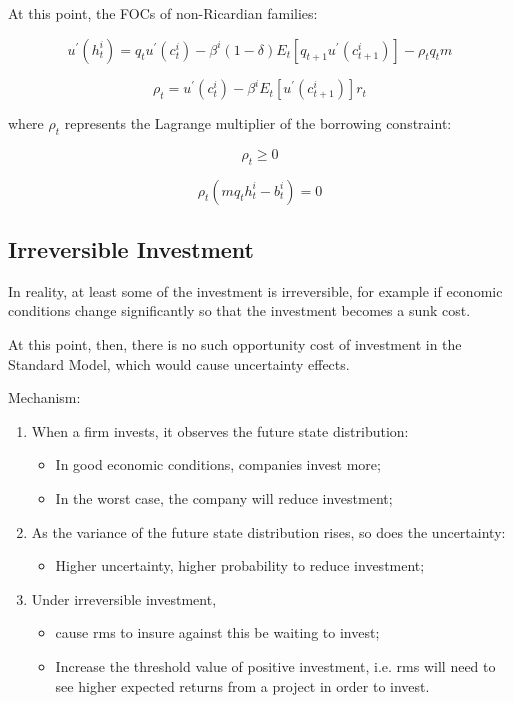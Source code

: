 \documentclass[10pt,math=newtx,citestyle=gb7714-2015,bibstyle=gb7714-2015]{elegantbook}
\begin{document}
At this point, the FOCs of non-Ricardian families:

\begin{equation}\label{label}
	u^{'}(h_t^i)=q_tu^{'}(c_t^i)-\beta^i(1-\delta)E_t[q_{t+1}u^{'}(c_{t+1}^i)]-\rho_tq_tm
\end{equation}

\begin{equation}\label{label}
	\rho_t=u^{'}(c_{t}^i)-\beta^iE_t\left[u^{'}(c_{t+1}^i)\right]r_t
\end{equation}

where $\rho_t$ represents the Lagrange multiplier of the borrowing constraint:

\begin{equation}\label{label}
	\rho_t\ge0
\end{equation}

\begin{equation}\label{label}
	\rho_t(mq_th_t^i-b_t^i)=0
\end{equation}

\subsection{Irreversible Investment}

In reality, at least some of the investment is irreversible, for example if economic conditions change significantly so that the investment becomes a sunk cost.

At this point, then, there is no such opportunity cost of investment in the Standard Model, which would cause uncertainty effects.

Mechanism:
\begin{enumerate}
	\item When a firm invests, it observes the future state distribution:
	\begin{itemize}
		\item In good economic conditions, companies invest more;
		\item In the worst case, the company will reduce investment;
	\end{itemize}
	\item As the variance of the future state distribution rises, so does the uncertainty:
	\begin{itemize}
		\item Higher uncertainty, higher probability to reduce investment;
	\end{itemize}
	\item Under irreversible investment,
	\begin{itemize}
		\item cause rms to insure against this be waiting to invest;
		\item Increase the threshold value of positive investment, i.e. rms will need to see higher expected returns from a project in order to invest.
	\end{itemize}
\end{enumerate}
\end{document}
